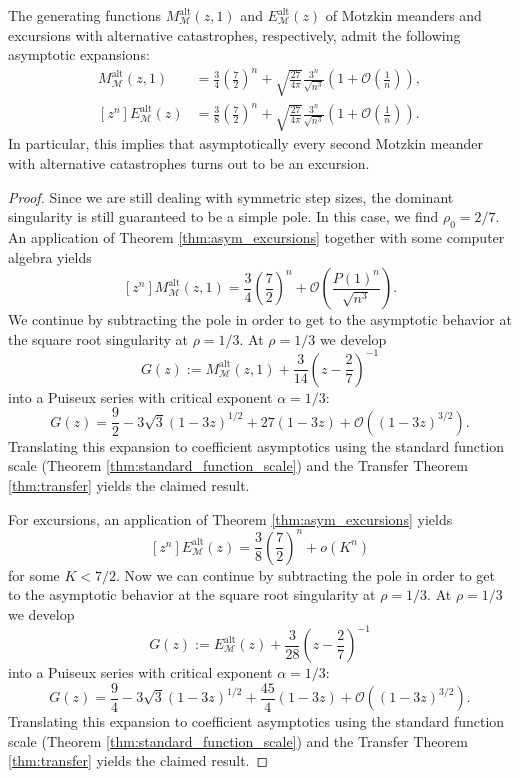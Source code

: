 \begin{corollary}
  The generating functions $M_\mathcal{M}^\mathrm{alt}(z,1)$ and $E_\mathcal{M}^\mathrm{alt}(z)$ of Motzkin meanders and excursions with alternative catastrophes, respectively, admit the following asymptotic expansions: 
  \begin{align*}
    [z^{n}]M_\mathcal{M}^\mathrm{alt}(z,1) &= \frac{3}{4} \left(\frac{7}{2}\right)^n + \sqrt{\frac{27}{4\pi}}\frac{3^n}{\sqrt{n^{3}}}\left(1 + \mathcal{O}\left(\frac{1}{n}\right)\right), \\
    [z^{n}]E_\mathcal{M}^\mathrm{alt}(z) &= \frac{3}{8} \left(\frac{7}{2}\right)^n + \sqrt{\frac{27}{4\pi}}\frac{3^n}{\sqrt{n^{3}}}\left(1 + \mathcal{O}\left(\frac{1}{n}\right)\right).
  \end{align*}
  In particular, this implies that asymptotically every second Motzkin meander with alternative catastrophes turns out to be an excursion.
\end{corollary}

\begin{proof}
  Since we are still dealing with symmetric step sizes, the dominant singularity is still guaranteed to be a simple pole. In this case, we find $\rho_0 = 2/7$. An application of Theorem \ref{thm:asym_excursions}
  together with some computer algebra yields
  $$
  [z^n] M_\mathcal{M}^\mathrm{alt}(z,1) = \frac{3}{4} \left(\frac{7}{2}\right)^n + \mathcal{O}\left(\frac{P(1)^n}{\sqrt{n^3}}\right).
  $$
  We continue by subtracting the pole in order to get to the asymptotic behavior at the square root singularity at $\rho = 1/3$.
  At $\rho = 1/3$ we develop 
  $$
    G(z) := M_\mathcal{M}^\mathrm{alt}(z,1) + \frac{3}{14} \left(z -\frac{2}{7}\right)^{-1}
  $$
  into a Puiseux series with critical exponent $\alpha = 1/3$: 
  $$
    G(z) = \frac{9}{2} - 3\sqrt{3}(1-3z)^{1/2}  + 27(1-3z) + \mathcal{O}((1-3z)^{3/2}).
  $$
  Translating this expansion to coefficient asymptotics using the standard function scale (Theorem \ref{thm:standard_function_scale}) and the Transfer Theorem \ref{thm:transfer} yields the claimed result.

  For excursions, an application of Theorem \ref{thm:asym_excursions} yields
  $$
    [z^{n}]E_\mathcal{M}^\mathrm{alt}(z) = \frac{3}{8} \left(\frac{7}{2}\right)^n + o(K^n)
  $$
  for some $K < 7/2$. Now we can continue by subtracting the pole in order to get to the asymptotic behavior at the square root singularity at $\rho = 1/3$.
  At $\rho = 1/3$ we develop 
  $$
    G(z) := E_\mathcal{M}^\mathrm{alt}(z) + \frac{3}{28} \left(z -\frac{2}{7}\right)^{-1}
  $$
  into a Puiseux series with critical exponent $\alpha = 1/3$: 
  $$
    G(z) = \frac{9}{4} - 3\sqrt{3}(1-3z)^{1/2}  + \frac{45}{4}(1-3z) + \mathcal{O}((1-3z)^{3/2}).
  $$
  Translating this expansion to coefficient asymptotics using the standard function scale (Theorem \ref{thm:standard_function_scale}) and the Transfer Theorem \ref{thm:transfer} yields the claimed result.
\end{proof}

